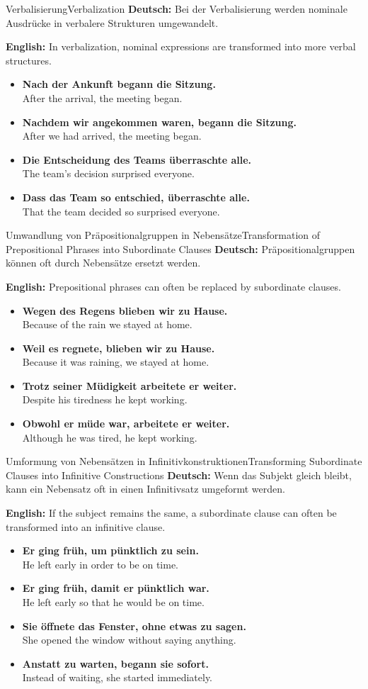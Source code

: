 \documentclass[a4paper,11pt]{article}
\newcommand{\GermanText}[1]{\textbf{Deutsch: }#1\par}
\newcommand{\EnglishText}[1]{{\color{SoftGray}\textbf{English: }#1\par}}
\newcommand{\ExampleItem}[2]{\item \textbf{#1}\\{\color{SoftGray}#2}}
\begin{document}
\begin{grammarentry}{Verbalisierung}{Verbalization}
    \GermanText{Bei der Verbalisierung werden nominale Ausdrücke in verbalere Strukturen umgewandelt.}
    \EnglishText{In verbalization, nominal expressions are transformed into more verbal structures.}
    \begin{exbox}
        \begin{itemize}
            \ExampleItem{Nach der Ankunft begann die Sitzung.}{After the arrival, the meeting began.}
            \ExampleItem{Nachdem wir angekommen waren, begann die Sitzung.}{After we had arrived, the meeting began.}
            \ExampleItem{Die Entscheidung des Teams überraschte alle.}{The team's decision surprised everyone.}
            \ExampleItem{Dass das Team so entschied, überraschte alle.}{That the team decided so surprised everyone.}
        \end{itemize}
    \end{exbox}
\end{grammarentry}

\begin{grammarentry}{Umwandlung von Präpositionalgruppen in Nebensätze}{Transformation of Prepositional Phrases into Subordinate Clauses}
    \GermanText{Präpositionalgruppen können oft durch Nebensätze ersetzt werden.}
    \EnglishText{Prepositional phrases can often be replaced by subordinate clauses.}
    \begin{exbox}
        \begin{itemize}
            \ExampleItem{Wegen des Regens blieben wir zu Hause.}{Because of the rain we stayed at home.}
            \ExampleItem{Weil es regnete, blieben wir zu Hause.}{Because it was raining, we stayed at home.}
            \ExampleItem{Trotz seiner Müdigkeit arbeitete er weiter.}{Despite his tiredness he kept working.}
            \ExampleItem{Obwohl er müde war, arbeitete er weiter.}{Although he was tired, he kept working.}
        \end{itemize}
    \end{exbox}
\end{grammarentry}

\begin{grammarentry}{Umformung von Nebensätzen in Infinitivkonstruktionen}{Transforming Subordinate Clauses into Infinitive Constructions}
    \GermanText{Wenn das Subjekt gleich bleibt, kann ein Nebensatz oft in einen Infinitivsatz umgeformt werden.}
    \EnglishText{If the subject remains the same, a subordinate clause can often be transformed into an infinitive clause.}
    \begin{exbox}
        \begin{itemize}
            \ExampleItem{Er ging früh, um pünktlich zu sein.}{He left early in order to be on time.}
            \ExampleItem{Er ging früh, damit er pünktlich war.}{He left early so that he would be on time.}
            \ExampleItem{Sie öffnete das Fenster, ohne etwas zu sagen.}{She opened the window without saying anything.}
            \ExampleItem{Anstatt zu warten, begann sie sofort.}{Instead of waiting, she started immediately.}
        \end{itemize}
    \end{exbox}
\end{grammarentry}
\end{document}
